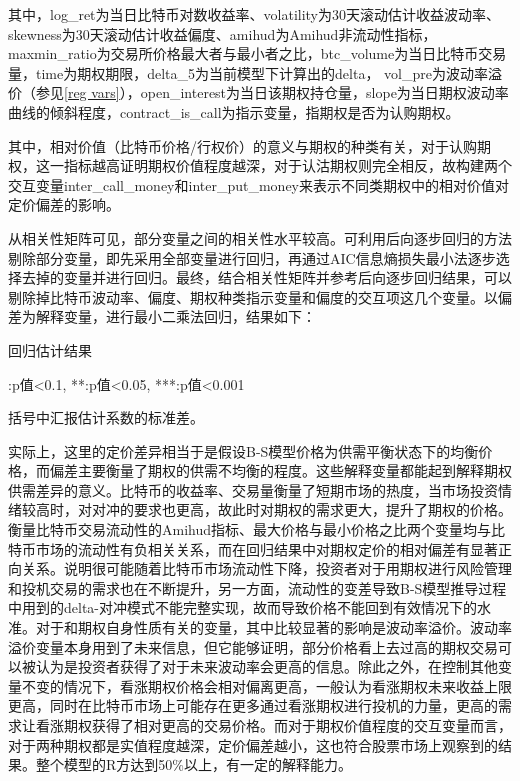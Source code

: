     \newpage
\restoregeometry
其中，log\_ret为当日比特币对数收益率、volatility为30天滚动估计收益波动率、skewness为30天滚动估计收益偏度、amihud为Amihud非流动性指标，maxmin\_ratio为交易所价格最大者与最小者之比，btc\_volume为当日比特币交易量，time为期权期限，delta\_5为当前模型下计算出的delta，
vol\_pre为波动率溢价（参见\ref{reg vars}），open\_interest为当日该期权持仓量，slope为当日期权波动率曲线的倾斜程度，contract\_is\_call为指示变量，指期权是否为认购期权。
\par{其中，相对价值（比特币价格/行权价）的意义与期权的种类有关，对于认购期权，这一指标越高证明期权价值程度越深，对于认沽期权则完全相反，故构建两个交互变量inter\_call\_money和inter\_put\_money来表示不同类期权中的相对价值对定价偏差的影响。}
\par{从相关性矩阵可见，部分变量之间的相关性水平较高。可利用后向逐步回归的方法剔除部分变量，即先采用全部变量进行回归，再通过AIC信息熵损失最小法逐步选择去掉的变量并进行回归。最终，结合相关性矩阵并参考后向逐步回归结果，可以剔除掉比特币波动率、偏度、期权种类指示变量和偏度的交互项这几个变量。以偏差为解释变量，进行最小二乘法回归，结果如下：}
\newpage
{}
\begin{center}
    \begin{threeparttable}[H]

        \caption{回归估计结果}
        
        
        \begin{tablenotes}
            \footnotesize
            \item *:p值<0.1, **:p值<0.05, ***:p值<0.001
            \item 括号中汇报估计系数的标准差。
        \end{tablenotes}
    \end{threeparttable}
\end{center}
\newpage
\restoregeometry
\par{
实际上，这里的定价差异相当于是假设B-S模型价格为供需平衡状态下的均衡价格，而偏差主要衡量了期权的供需不均衡的程度。这些解释变量都能起到解释期权供需差异的意义。比特币的收益率、交易量衡量了短期市场的热度，当市场投资情绪较高时，对对冲的要求也更高，故此时对期权的需求更大，提升了期权的价格。衡量比特币交易流动性的Amihud指标、最大价格与最小价格之比两个变量均与比特币市场的流动性有负相关关系，而在回归结果中对期权定价的相对偏差有显著正向关系。说明很可能随着比特币市场流动性下降，投资者对于用期权进行风险管理和投机交易的需求也在不断提升，另一方面，流动性的变差导致B-S模型推导过程中用到的delta-对冲模式不能完整实现，故而导致价格不能回到有效情况下的水准。对于和期权自身性质有关的变量，其中比较显著的影响是波动率溢价。波动率溢价变量本身用到了未来信息，但它能够证明，部分价格看上去过高的期权交易可以被认为是投资者获得了对于未来波动率会更高的信息。除此之外，在控制其他变量不变的情况下，看涨期权价格会相对偏离更高，一般认为看涨期权未来收益上限更高，同时在比特币市场上可能存在更多通过看涨期权进行投机的力量，更高的需求让看涨期权获得了相对更高的交易价格。而对于期权价值程度的交互变量而言，对于两种期权都是实值程度越深，定价偏差越小，这也符合股票市场上观察到的结果。整个模型的R方达到50$\%$以上，有一定的解释能力。
}
